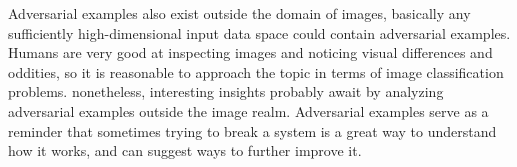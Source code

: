 \documentclass[11pt, a4paper]{article}
\begin{document}
Adversarial examples also exist outside the domain of images, basically any sufficiently high-dimensional input data space could contain adversarial examples. Humans are very good at inspecting images and noticing visual differences and oddities, so it is reasonable to approach the topic in terms of image classification problems. nonetheless, interesting insights probably await by analyzing adversarial examples outside the image realm. Adversarial examples serve as a reminder that sometimes trying to break a system is a great way to understand how it works, and can suggest ways to further improve it.

\end{document}
